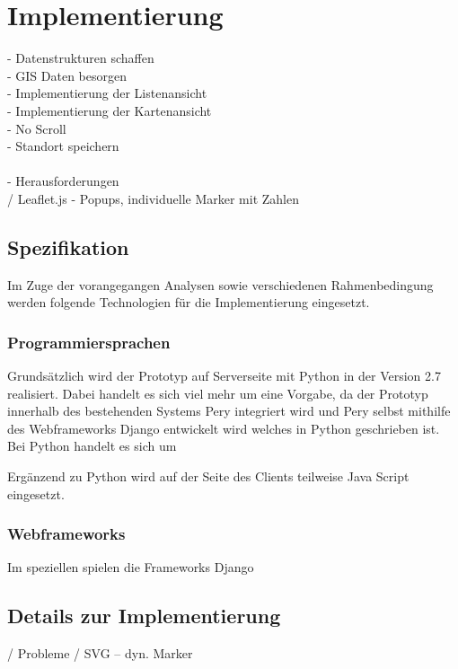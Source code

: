 \documentclass[Bachelorarbeit.tex]{subfiles}
\begin{document}
\chapter{Implementierung}
\label{chap:implementierung}


 - Datenstrukturen schaffen\\
 - GIS Daten besorgen\\
 - Implementierung der Listenansicht\\
 - Implementierung der Kartenansicht\\
 - No Scroll\\
 - Standort speichern\\
 \\
 - Herausforderungen\\
 / Leaflet.js - Popups, individuelle Marker mit Zahlen


\section{Spezifikation}
\label{chap:implementierung:sec:spezifikation}
Im Zuge der vorangegangen Analysen sowie verschiedenen Rahmenbedingung werden folgende Technologien für die Implementierung eingesetzt. 

\subsection*{Programmiersprachen}
Grundsätzlich wird der Prototyp auf Serverseite mit Python in der Version 2.7 realisiert. 
Dabei handelt es sich viel mehr um eine Vorgabe, da der Prototyp innerhalb des bestehenden Systems Pery integriert wird und Pery selbst mithilfe des Webframeworks Django entwickelt wird welches in Python geschrieben ist.
Bei Python handelt es sich um 

Ergänzend zu Python wird auf der Seite des Clients teilweise Java Script eingesetzt. 

\subsection*{Webframeworks}
Im speziellen spielen die Frameworks Django 

\section{Details zur Implementierung}
\label{chap:implementierung:sec:details}

/ Probleme
/ SVG -- dyn. Marker
\end{document}
